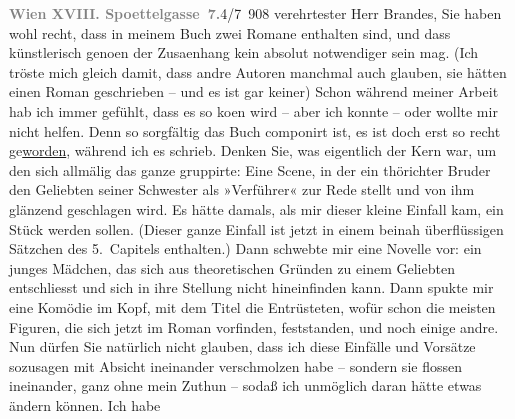 \pstart
           \textcolor{gray}{\textbf{Wien XVIII. Spoettelgasse 7.}}\hfill 4/7 908\pend
           \vspace{0.5em}
\pstart
           verehrtester Herr Brandes, Sie haben wohl recht, dass in meinem Buch zwei Romane enthalten
               sind, und dass künstlerisch geno{\geminationm}en der Zusa{\geminationm}enhang kein absolut notwendiger sein mag. (Ich tröste
               mich gleich damit, dass andre Autoren manchmal auch glauben, sie hätten einen Roman
               geschrieben – und es ist gar keiner) Schon während meiner Arbeit hab ich immer
               gefühlt, dass es so ko{\geminationm}en wird – aber ich konnte – oder
               wollte mir nicht helfen. Denn so sorgfältig das Buch componirt ist, es ist doch erst
               so recht ge{\pb}\uline{worden}, während ich es schrieb. Denken Sie, was
               eigentlich der Kern war, um den sich allmälig das ganze gruppirte: Eine Scene, in der
               ein thörichter Bruder den Geliebten seiner Schwester als »Verführer« zur Rede stellt
               und von ihm glänzend geschlagen wird. Es hätte damals, als mir dieser kleine Einfall
               kam, ein Stück werden sollen. (Dieser ganze Einfall ist jetzt in einem beinah
               überflüssigen Sätzchen des 5. Capitels enthalten.) Dann schwebte mir eine Novelle
               vor: ein junges Mädchen, das sich aus theoretischen Gründen zu einem Geliebten
               entschliesst und sich in ihre Stellung nicht hineinfinden kann. Dann spukte mir eine
               Komödie im Kopf, mit dem Titel {\pb}die Entrüsteten, wofür schon die
               meisten Figuren, die sich jetzt im Roman vorfinden, feststanden, und noch einige
               andre. Nun dürfen Sie natürlich nicht glauben, dass ich diese Einfälle und Vorsätze
               sozusagen mit Absicht ineinander verschmolzen habe – sondern sie flossen ineinander,
               ganz ohne mein Zuthun – sodaß ich unmöglich daran hätte etwas ändern können. Ich habe
